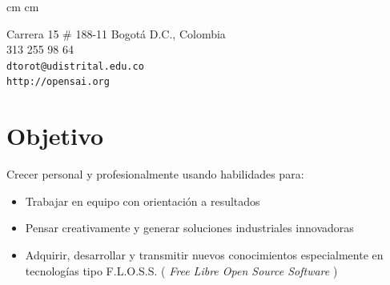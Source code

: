 \documentclass[overlapped,line,final]{res}
\begin{document}

\begin{resume}

 cm
 cm
\begin{minipage}{\linewidth}
	\begin{minipage}{0.5\linewidth} %
    		Carrera 15 \# 188-11  \newline %
    		Bogotá D.C., Colombia \\ %
    		313 255 98 64 \\ %
    		{\tt dtorot@udistrital.edu.co} \\ %
     	{\tt http://opensai.org} \\ %
	\end{minipage}
	\begin{minipage}{0.5\linewidth}

	\end{minipage}
\end{minipage}


\vspace{0.5cm}
\section{\sc Objetivo}
\vspace{0.5cm}
Crecer personal y profesionalmente usando habilidades para:
\vspace{2mm}
\begin{itemize}
  \item Trabajar en equipo con orientación a resultados
  \item Pensar creativamente y generar soluciones industriales innovadoras
  \item Adquirir, desarrollar y transmitir nuevos conocimientos especialmente en tecnologías tipo F.L.O.S.S. ( {\em Free Libre Open Source Software } ) 
  
\end{itemize}


\end{resume}
\end{document}
